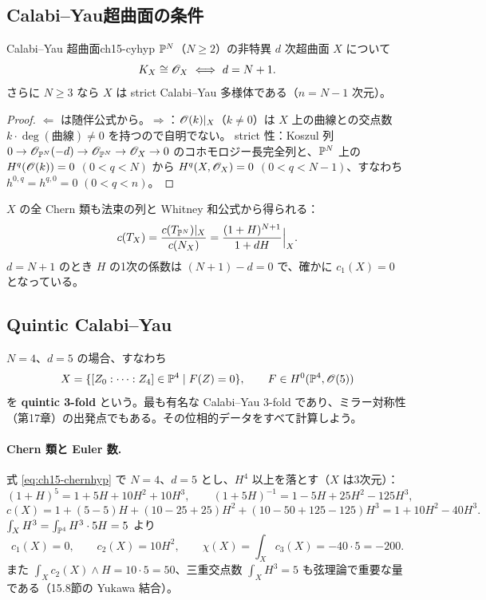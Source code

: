 \subsection{Calabi--Yau超曲面の条件}

\begin{mycor}{Calabi--Yau 超曲面}{ch15-cyhyp}
$\mathbb{P}^N$（$N\geq 2$）の非特異 $d$ 次超曲面 $X$ について
\[
K_X\cong\OO_X\ \Longleftrightarrow\ d = N+1 .
\]
さらに $N\ge3$ なら $X$ は strict Calabi--Yau 多様体である（$n = N-1$ 次元）。
\end{mycor}

\begin{proof}
$\Leftarrow$ は随伴公式から。$\Rightarrow$：$\mathscr{O}(k)|_X$（$k\neq0$）は $X$ 上の曲線との交点数 $k\cdot\deg(\text{曲線})\ne0$ を持つので自明でない。
strict 性：Koszul 列 $0\to\mathscr{O}_{\mathbb{P}^N}(-d)\to\mathscr{O}_{\mathbb{P}^N}\to\mathscr{O}_X\to0$ のコホモロジー長完全列と、$\mathbb{P}^N$ 上の $H^q(\mathscr{O}(k)) = 0$ $(0<q<N)$ から
$H^q(X,\mathscr{O}_X) = 0$ $(0<q<N-1)$、すなわち $h^{0,q} = h^{q,0} = 0$ $(0<q<n)$。
\end{proof}

$X$ の全 Chern 類も法束の列と Whitney 和公式から得られる：
\begin{equation}\label{eq:ch15-chernhyp}
c(T_X) = \frac{c(T_{\mathbb{P}^N})|_X}{c(N_{X})} = \frac{(1+H)^{N+1}}{1+dH}\Big|_X .
\end{equation}
$d = N+1$ のとき $H$ の1次の係数は $(N+1) - d = 0$ で、確かに $c_1(X) = 0$ となっている。

\subsection{Quintic Calabi--Yau}

$N = 4$、$d = 5$ の場合、すなわち
\[
X = \{[Z_0:\cdots:Z_4]\in\mathbb{P}^4\mid F(Z)=0\},\qquad F\in H^0(\mathbb{P}^4,\mathscr{O}(5))
\]
を \textbf{quintic 3-fold} という。最も有名な Calabi--Yau 3-fold であり、ミラー対称性（第17章）の出発点でもある。その位相的データをすべて計算しよう。

\paragraph{Chern 類と Euler 数.}
式 \eqref{eq:ch15-chernhyp} で $N=4$、$d=5$ とし、$H^4$ 以上を落とす（$X$ は3次元）：
\[
(1+H)^5 = 1+5H+10H^2+10H^3,\qquad (1+5H)^{-1} = 1-5H+25H^2-125H^3,
\]
\[
c(X) = 1 + (5-5)H + (10-25+25)H^2 + (10-50+125-125)H^3 = 1 + 10H^2 - 40H^3 .
\]
$\int_XH^3 = \int_{\mathbb{P}^4}H^3\cdot5H = 5$ より
\[
c_1(X) = 0,\qquad c_2(X) = 10H^2,\qquad \chi(X) = \int_Xc_3(X) = -40\cdot 5 = -200 .
\]
また $\int_X c_2(X)\wedge H = 10\cdot 5 = 50$、三重交点数 $\int_XH^3 = 5$ も弦理論で重要な量である（15.8節の Yukawa 結合）。


